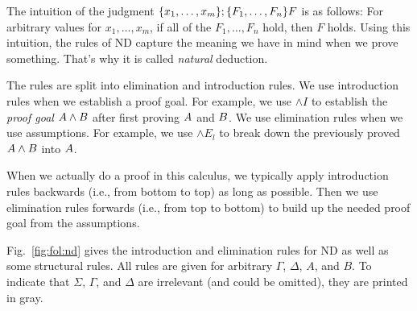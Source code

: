The intuition of the judgment $\{x_1,\ldots,x_m\};\{F_1,\ldots,F_n\} F$ is as follows: For arbitrary values for $x_1,\ldots,x_m$, if all of the $F_1,\ldots,F_n$ hold, then $F$ holds. Using this intuition, the rules of ND capture the meaning we have in mind when we prove something. That's why it is called \emph{natural} deduction.
\bigskip

The rules are split into elimination and introduction rules. We use introduction rules when we establish a proof goal. For example, we use $\wedge I$ to establish the \emph{proof goal} $ A\wedge B$ after first proving $ A$ and $ B$. We use elimination rules when we use assumptions. For example, we use $\wedge E_l$ to break down the previously proved $ A\wedge B$ into $ A$.

When we actually do a proof in this calculus, we typically apply introduction rules backwards (i.e., from bottom to top) as long as possible. Then we use elimination rules forwards (i.e., from top to bottom) to build up the needed proof goal from the assumptions.
\bigskip

Fig.~\ref{fig:fol:nd} gives the introduction and elimination rules for ND as well as some structural rules. All rules are given for arbitrary $\Gamma$, $\Delta$, $A$, and $B$. To indicate that $\Sigma$, $\Gamma$, and $\Delta$ are irrelevant (and could be omitted), they are printed in gray.
\medskip

\newcommand{\gdseqa}[1]{\gGamma;\gDelta\der_{\gSigma} #1}
\newcommand{\gdseqb}[2]{\gGamma;\gDelta,#1\der_{\gSigma} #2}
\newcommand{\gdseqc}[2]{\gGamma,#1;\gDelta\der_{\gSigma} #2}
\newcommand{\gdseqbc}[3]{\gGamma,#1;\gDelta,#2\der_{\gSigma} #3}

